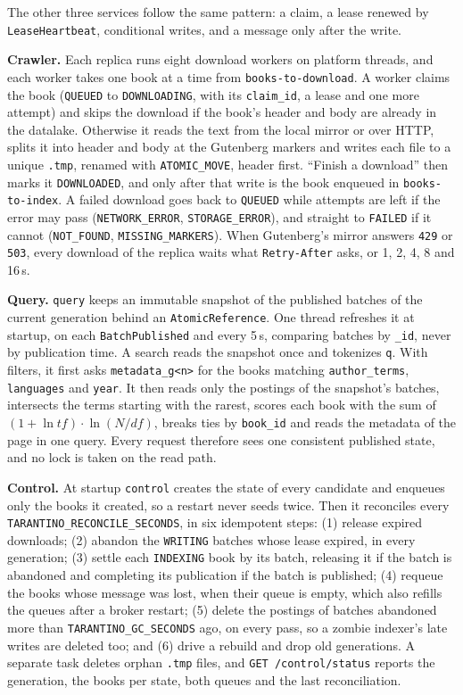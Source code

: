 \documentclass[11pt,a4paper]{article}
\newcommand{\code}[1]{\nolinkurl{#1}}
\begin{document}
The other three services follow the same pattern: a claim, a lease renewed by \code{LeaseHeartbeat}, conditional
writes, and a message only after the write.

\textbf{Crawler.} Each replica runs eight download workers on platform threads, and each worker takes one book at a
time from \code{books-to-download}. A worker claims the book (\code{QUEUED} to \code{DOWNLOADING}, with its
\code{claim_id}, a lease and one more attempt) and skips the download if the book's header and body are already in the
datalake.
Otherwise it reads the text from the local mirror or over HTTP, splits it into header and body at the Gutenberg markers
and writes each file to a unique \code{.tmp}, renamed with \code{ATOMIC_MOVE}, header first. ``Finish a download'' then
marks it \code{DOWNLOADED}, and only after that write is the book enqueued in \code{books-to-index}. A failed download
goes back to \code{QUEUED} while attempts are left if the error may pass (\code{NETWORK_ERROR},
\code{STORAGE_ERROR}), and straight to \code{FAILED} if it cannot (\code{NOT_FOUND}, \code{MISSING_MARKERS}). When
Gutenberg's mirror answers \code{429} or \code{503}, every download of the replica waits what \code{Retry-After} asks,
or 1, 2, 4, 8 and 16\,s.

\textbf{Query.} \code{query} keeps an immutable snapshot of the published batches of the current generation behind an
\code{AtomicReference}. One thread refreshes it at startup, on each \code{BatchPublished} and every 5\,s, comparing
batches by \code{_id}, never by publication time. A search reads the snapshot once and tokenizes \code{q}. With
filters, it first asks \code{metadata_g<n>} for the books matching \code{author_terms}, \code{languages} and
\code{year}. It then reads only the postings of the snapshot's batches, intersects the terms starting with the rarest,
scores each book with the sum of $(1 + \ln tf) \cdot \ln(N/df)$, breaks ties by \code{book_id} and reads the metadata of
the page in one query. Every request therefore sees one consistent published state, and no lock is taken on the read
path.

\textbf{Control.} At startup \code{control} creates the state of every candidate and enqueues only the books it
created, so a restart never seeds twice. Then it reconciles every \code{TARANTINO_RECONCILE_SECONDS}, in six idempotent
steps: (1) release expired downloads; (2) abandon the \code{WRITING} batches whose lease expired, in every generation;
(3) settle each \code{INDEXING} book by its batch, releasing it if the batch is abandoned and completing its publication
if the batch is published; (4) requeue the books whose message was lost, when their queue is empty, which also refills
the queues after a broker restart; (5) delete the postings of batches abandoned more than \code{TARANTINO_GC_SECONDS}
ago, on every pass, so a zombie indexer's late writes are deleted too; and (6) drive a rebuild and drop old
generations. A separate task deletes orphan \code{.tmp} files, and \code{GET /control/status} reports the generation,
the books per state, both queues and the last reconciliation.
\end{document}
